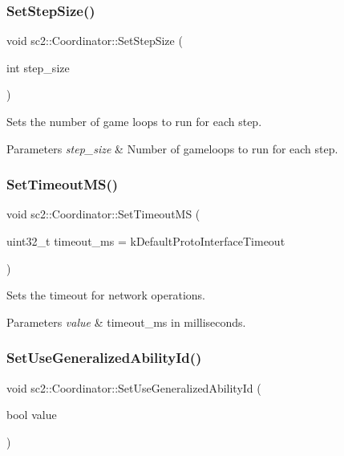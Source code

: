 \subsubsection{\texorpdfstring{Set\+Step\+Size()}{SetStepSize()}}
{\footnotesize\ttfamily void sc2\+::\+Coordinator\+::\+Set\+Step\+Size (\begin{DoxyParamCaption}\item[{int}]{step\+\_\+size }\end{DoxyParamCaption})}

Sets the number of game loops to run for each step. 
\begin{DoxyParams}{Parameters}
{\em step\+\_\+size} & Number of gameloops to run for each step. \\
\hline
\end{DoxyParams}
\mbox{\label{classsc2_1_1_coordinator_aadbfd927d66314a4eb949b2de2ae37b4}} 
\subsubsection{\texorpdfstring{Set\+Timeout\+M\+S()}{SetTimeoutMS()}}
{\footnotesize\ttfamily void sc2\+::\+Coordinator\+::\+Set\+Timeout\+MS (\begin{DoxyParamCaption}\item[{uint32\+\_\+t}]{timeout\+\_\+ms = {\ttfamily kDefaultProtoInterfaceTimeout} }\end{DoxyParamCaption})}

Sets the timeout for network operations. 
\begin{DoxyParams}{Parameters}
{\em value} & timeout\+\_\+ms in milliseconds. \\
\hline
\end{DoxyParams}
\mbox{\label{classsc2_1_1_coordinator_a8aedd93ba1d7eb9e81b37b34ff76147c}} 
\subsubsection{\texorpdfstring{Set\+Use\+Generalized\+Ability\+Id()}{SetUseGeneralizedAbilityId()}}
{\footnotesize\ttfamily void sc2\+::\+Coordinator\+::\+Set\+Use\+Generalized\+Ability\+Id (\begin{DoxyParamCaption}\item[{bool}]{value }\end{DoxyParamCaption})}

